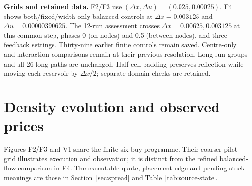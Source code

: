 \documentclass[11pt,a4paper]{article}
\newcommand{\du}{\Delta u}\newcommand{\dx}{\Delta x}\newcommand{\lap}{\delta_x^2}
\begin{document}
\textbf{Grids and retained data.} F2/F3 use $(\dx,\du)=(0.025,0.00025)$.
F4 shows both/fixed/width-only balanced controls at $\dx=0.003125$ and
$\du=0.00000390625$.
The 12-run assessment crosses $\dx=0.00625,0.003125$ at this common step,
phases 0 (on nodes) and 0.5 (between nodes), and three feedback settings.
Thirty-nine earlier finite controls remain saved. Centre-only and interaction
comparisons remain at their previous resolution. Long-run groups and all
26 long paths are unchanged. Half-cell padding preserves reflection while
moving each reservoir by $\dx/2$; separate domain checks are retained.

\clearpage
\section{Density evolution and observed prices}
Figures F2/F3 and V1 share the finite six-buy programme. Their coarser pilot grid illustrates execution and observation; it is distinct from the refined balanced-flow comparison in F4. The executable quote, placement edge and pending stock meanings are those in Section~\ref{sec:spread} and Table~\ref{tab:source-state}.
\end{document}

